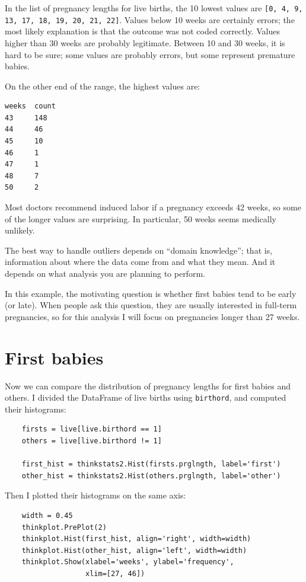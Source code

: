 \documentclass[12pt]{book}
\begin{document}
In the list of pregnancy lengths for live births, the 10 lowest values
are {\tt [0, 4, 9, 13, 17, 18, 19, 20, 21, 22]}.  Values below 10 weeks
are certainly errors; the most likely explanation is that the outcome
was not coded correctly.  Values higher than 30 weeks are probably
legitimate.  Between 10 and 30 weeks, it is hard to be sure; some
values are probably errors, but some represent premature babies.

On the other end of the range, the highest values are:
%
\begin{verbatim}
weeks  count
43     148
44     46
45     10
46     1
47     1
48     7
50     2
\end{verbatim}

Most doctors recommend induced labor if a pregnancy exceeds 42 weeks,
so some of the longer values are surprising.  In particular, 50 weeks
seems medically unlikely.

The best way to handle outliers depends on ``domain knowledge'';
that is, information about where the data come from and what they
mean.  And it depends on what analysis you are planning to perform.

In this example, the motivating question is whether first babies
tend to be early (or late).  When people ask this question, they are
usually interested in full-term pregnancies, so for this analysis
I will focus on pregnancies longer than 27 weeks.


\section{First babies}

Now we can compare the distribution of pregnancy lengths for first
babies and others.  I divided the DataFrame of live births using
{\tt birthord}, and computed their histograms:

\begin{verbatim}
    firsts = live[live.birthord == 1]
    others = live[live.birthord != 1]

    first_hist = thinkstats2.Hist(firsts.prglngth, label='first')
    other_hist = thinkstats2.Hist(others.prglngth, label='other')
\end{verbatim}

Then I plotted their histograms on the same axis:

\begin{verbatim}
    width = 0.45
    thinkplot.PrePlot(2)
    thinkplot.Hist(first_hist, align='right', width=width)
    thinkplot.Hist(other_hist, align='left', width=width)
    thinkplot.Show(xlabel='weeks', ylabel='frequency',
                   xlim=[27, 46])
\end{verbatim}
\end{document}
